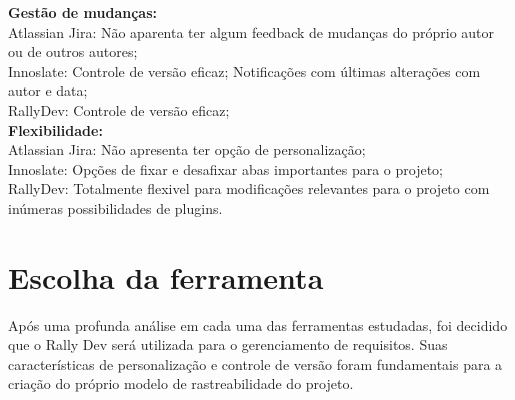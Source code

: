 \textbf{Gestão de mudanças:}\\
\tab Atlassian Jira: Não aparenta ter algum feedback de mudanças do próprio autor ou de outros autores;\\
\tab Innoslate: Controle de versão eficaz; Notificações com últimas alterações com autor e data;\\
\tab RallyDev: Controle de versão eficaz;\\

\textbf{Flexibilidade:} \\
\tab Atlassian Jira: Não apresenta ter opção de personalização;\\
\tab Innoslate: Opções de fixar e desafixar abas importantes para o projeto;\\
\tab RallyDev: Totalmente flexivel para modificações relevantes para o projeto com inúmeras possibilidades de plugins.\\

\section {\large{Escolha da ferramenta}}

\tab Após uma profunda análise em cada uma das ferramentas estudadas, foi decidido que o Rally Dev será utilizada para o gerenciamento de requisitos. Suas características de personalização e controle de versão foram fundamentais para a criação do próprio modelo de rastreabilidade do projeto.  \\
